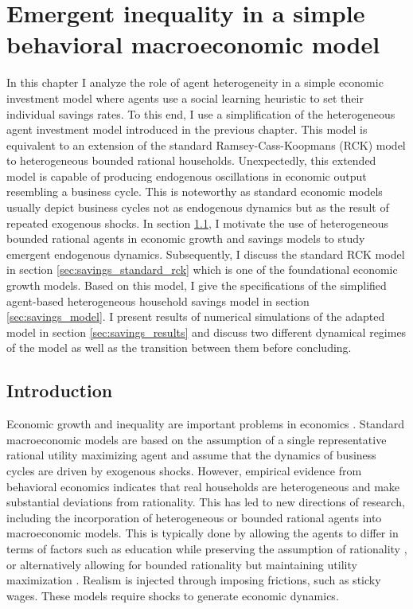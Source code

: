 \chapter{Emergent inequality in a simple behavioral macroeconomic model}
\label{chapter:savings}

In this chapter I analyze the role of agent heterogeneity in a simple economic investment model where agents use a social learning heuristic to set their individual savings rates. To this end, I use a simplification of the heterogeneous agent investment model introduced in the previous chapter. This model is equivalent to an extension of the standard Ramsey-Cass-Koopmans (RCK) model to heterogeneous bounded rational households. Unexpectedly, this extended model is capable of producing endogenous oscillations in economic output resembling a business cycle. This is noteworthy as standard economic models usually depict business cycles not as endogenous dynamics but as the result of repeated exogenous shocks. In section \ref{sec:savings_introduction}, I motivate the use of heterogeneous bounded rational agents in economic growth and savings models to study emergent endogenous dynamics. Subsequently, I discuss the standard RCK model in section \ref{sec:savings_standard_rck} which is one of the foundational economic growth models. Based on this model, I give the specifications of the simplified agent-based heterogeneous household savings model in section \ref{sec:savings_model}. I present results of numerical simulations of the adapted model in section \ref{sec:savings_results} and discuss two different dynamical regimes of the model as well as the transition between them before concluding.

\section{Introduction}
\label{sec:savings_introduction}

Economic growth and inequality are important problems in economics \citep{Acemoglu2009, piketty2015capital}. Standard macroeconomic models are based on the assumption of a single representative rational utility maximizing agent and assume that the dynamics of business cycles are driven by exogenous shocks. However, empirical evidence from behavioral economics indicates that real households are heterogeneous and make substantial deviations from rationality.   This has led to new directions of research, including the incorporation of heterogeneous or bounded rational agents into macroeconomic models. This is typically done by allowing the agents to differ in terms of factors such as education while preserving the assumption of rationality \citep{ hank_reviewLeahy2018, hank_branch2009new, hank_zhao2018many}, or alternatively allowing for bounded rationality but maintaining utility maximization \citep{hank_gabaix2016behavioral}.  Realism is injected through imposing frictions, such as sticky wages.  These models require shocks to generate economic dynamics.

